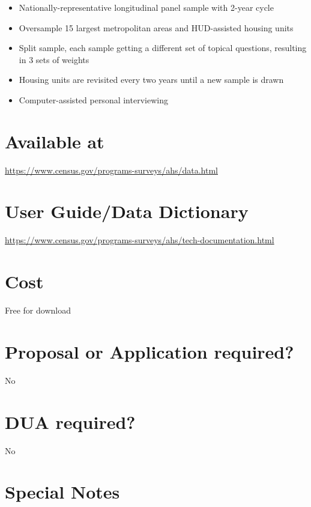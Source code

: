 \documentclass[
]{book}
\providecommand{\tightlist}{%
  \setlength{\itemsep}{0pt}\setlength{\parskip}{0pt}}
\begin{document}
\begin{itemize}
\tightlist
\item
  Nationally-representative longitudinal panel sample with 2-year cycle
\item
  Oversample 15 largest metropolitan areas and HUD-assisted housing units
\item
  Split sample, each sample getting a different set of topical questions, resulting in 3 sets of weights
\item
  Housing units are revisited every two years until a new sample is drawn
\item
  Computer-assisted personal interviewing
\end{itemize}

\hypertarget{available-at-7}{%
\section{Available at}\label{available-at-7}}

\url{https://www.census.gov/programs-surveys/ahs/data.html}

\hypertarget{user-guidedata-dictionary-7}{%
\section{User Guide/Data Dictionary}\label{user-guidedata-dictionary-7}}

\url{https://www.census.gov/programs-surveys/ahs/tech-documentation.html}

\hypertarget{cost-7}{%
\section{Cost}\label{cost-7}}

Free for download

\hypertarget{proposal-or-application-required-7}{%
\section{Proposal or Application required?}\label{proposal-or-application-required-7}}

No

\hypertarget{dua-required-7}{%
\section{DUA required?}\label{dua-required-7}}

No

\hypertarget{special-notes-7}{%
\section{Special Notes}\label{special-notes-7}}
\end{document}
